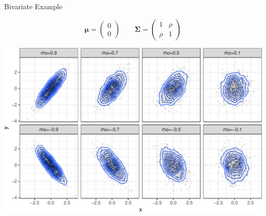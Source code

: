 \documentclass[11pt,ignorenonframetext,]{beamer}
\begin{document}
\begin{frame}{%
\protect\hypertarget{bivariate-example}{%
Bivariate Example}}

\scriptsize

\[ \symbf{\mu} = \begin{pmatrix}0 \\ 0\end{pmatrix} \qquad \symbf{\Sigma} = \begin{pmatrix}1 & \rho \\ \rho & 1 \end{pmatrix}\]

\begin{center}\includegraphics[width=\textwidth]{Lec12_files/figure-beamer/unnamed-chunk-1-1} \end{center}

\end{frame}
\end{document}
